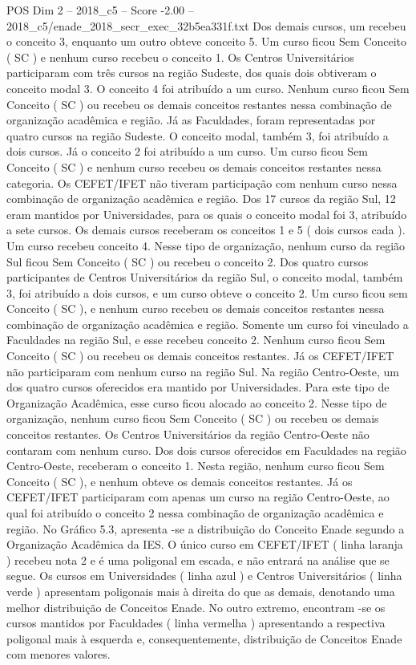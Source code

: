 \begin{textsample}{POS Dim 2 – 2018\_c5 – Score -2.00 – 2018\_c5/enade\_2018\_secr\_exec\_32b5ea331f.txt}
Dos demais cursos, um recebeu o conceito 3, enquanto um outro obteve conceito 5.
Um curso ficou Sem Conceito ( SC ) e nenhum curso recebeu o conceito 1.
Os Centros Universitários participaram com três cursos na região Sudeste, dos quais dois obtiveram o conceito modal 3.
O conceito 4 foi atribuído a um curso.
Nenhum curso ficou Sem Conceito ( SC ) ou recebeu os demais conceitos restantes nessa combinação de organização acadêmica e região.
Já as Faculdades, foram representadas por quatro cursos na região Sudeste.
O conceito modal, também 3, foi atribuído a dois cursos.
Já o conceito 2 foi atribuído a um curso.
Um curso ficou Sem Conceito ( SC ) e nenhum curso recebeu os demais conceitos restantes nessa categoria.
Os CEFET/IFET não tiveram participação com nenhum curso nessa combinação de organização acadêmica e região.
Dos 17 cursos da região Sul, 12 eram mantidos por Universidades, para os quais o conceito modal foi 3, atribuído a sete cursos.
Os demais cursos receberam os conceitos 1 e 5 ( dois cursos cada ).
Um curso recebeu conceito 4.
Nesse tipo de organização, nenhum curso da região Sul ficou Sem Conceito ( SC ) ou recebeu o conceito 2.
Dos quatro cursos participantes de Centros Universitários da região Sul, o conceito modal, também 3, foi atribuído a dois cursos, e um curso obteve o conceito 2.
Um curso ficou sem Conceito ( SC ), e nenhum curso recebeu os demais conceitos restantes nessa combinação de organização acadêmica e região.
Somente um curso foi vinculado a Faculdades na região Sul, e esse recebeu conceito 2.
Nenhum curso ficou Sem Conceito ( SC ) ou recebeu os demais conceitos restantes.
Já os CEFET/IFET não participaram com nenhum curso na região Sul.
Na região Centro-Oeste, um dos quatro cursos oferecidos era mantido por Universidades.
Para este tipo de Organização Acadêmica, esse curso ficou alocado ao conceito 2.
Nesse tipo de organização, nenhum curso ficou Sem Conceito ( SC ) ou recebeu os demais conceitos restantes.
Os Centros Universitários da região Centro-Oeste não contaram com nenhum curso.
Dos dois cursos oferecidos em Faculdades na região Centro-Oeste, receberam o conceito 1.
Nesta região, nenhum curso ficou Sem Conceito ( SC ), e nenhum obteve os demais conceitos restantes.
Já os CEFET/IFET participaram com apenas um curso na região Centro-Oeste, ao qual foi atribuído o conceito 2 nessa combinação de organização acadêmica e região.
No Gráfico 5.3, apresenta -se a distribuição do Conceito Enade segundo a Organização Acadêmica da IES.
O único curso em CEFET/IFET ( linha laranja ) recebeu nota 2 e é uma poligonal em escada, e não entrará na análise que se segue.
Os cursos em Universidades ( linha azul ) e Centros Universitários ( linha verde ) apresentam poligonais mais à direita do que as demais, denotando uma melhor distribuição de Conceitos Enade.
No outro extremo, encontram -se os cursos mantidos por Faculdades ( linha vermelha ) apresentando a respectiva poligonal mais à esquerda e, consequentemente, distribuição de Conceitos Enade com menores valores.

\end{textsample}

